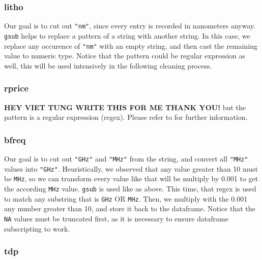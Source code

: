 \subsubsection*{litho}


Our goal is to cut out \verb|"nm"|, since every entry is recorded in nanometers anyway. \texttt{gsub} helps to replace a pattern 
of a string with another string. In this case, we replace any occurence of \verb|"nm"| with an empty string, and then cast the remaining 
value to numeric type. Notice that the pattern could be regular expression as well, this will be used intensively in the following cleaning
process.

\subsubsection*{rprice}


\textbf{HEY VIET TUNG WRITE THIS FOR ME THANK YOU!}
but the pattern is a regular expression (regex). Please refer to 
for further information.

\subsubsection*{bfreq}


Our goal is to cut out \verb|"GHz"| and \verb|"MHz"| from the string, and convert all \verb|"MHz"| values into \verb|"GHz"|. Heuristically,
we observed that any value greater than 10 must be \verb|MHz|, so we can transform every value like that will be multiply by 0.001 to get 
the according \verb|MHz| value. \texttt{gsub} is used like as above. This time, that regex is used to match any substring that is 
\verb|GHz| OR \verb|MHz|. Then, we multiply with the 0.001 any number greater than 10, and store it back to the dataframe. Notice that the
\texttt{NA} values must be truncated first, as it is necessary to ensure dataframe subscripting to work.

\subsubsection*{tdp}

